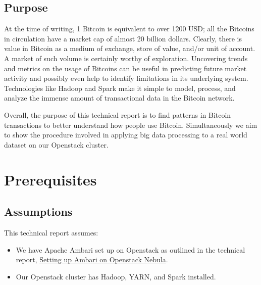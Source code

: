 \documentclass[9pt,twocolumn,twoside]{idsi}
\begin{document}
\subsection{Purpose}
At the time of writing, 1 Bitcoin is equivalent to over 1200 USD; all the Bitcoins in circulation have a market cap of almost 20 billion dollars. Clearly, there is value in Bitcoin as a medium of exchange, store of value, and/or unit of account. A market of such volume is certainly worthy of exploration. Uncovering trends and metrics on the usage of Bitcoins can be useful in predicting future market activity and possibly even help to identify limitations in its underlying system. Technologies like Hadoop and Spark make it simple to model, process, and analyze the immense amount of transactional data in the Bitcoin network.

Overall, the purpose of this technical report is to find patterns in Bitcoin transactions to better understand how people use Bitcoin. Simultaneously we aim to show the procedure involved in applying big data processing to a real world dataset on our Openstack cluster.

\section{Prerequisites}
\subsection{Assumptions}
This technical report assumes:
\begin{itemize}
    \item We have Apache Ambari set up on Openstack as outlined in the technical report, \href{https://github.com/lcdm-uiuc/idsi-core/blob/bitcoin_tr/reports/ambari_openstack_setup/ambari_openstack_setup.pdf}{Setting up Ambari on Openstack Nebula}.
    \item Our Openstack cluster has Hadoop, YARN, and Spark installed.
\end{itemize}
\end{document}
